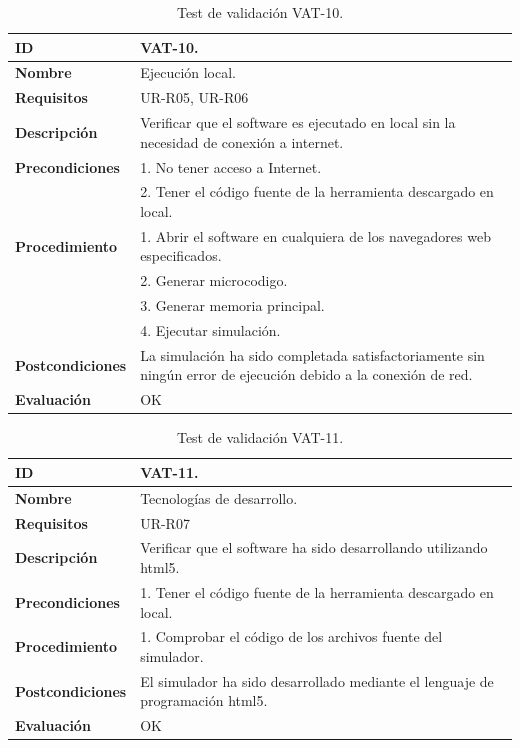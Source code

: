 \begin{center}
\begin{table}[htb]
\centering
\caption{Test de validación VAT-10.}
\begin{tabular}{@{}p{2.5cm} p{9cm}@{}} 
\toprule
\textbf{ID} 					& VAT-10. \\
\midrule
\textbf{Nombre} 				& Ejecución local. \\
\midrule
\textbf{Requisitos} 		& UR-R05, UR-R06\\
\midrule
\textbf{Descripción} 		& Verificar que el \gls{software} es ejecutado en local sin la necesidad de conexión a internet. \\
\midrule
\textbf{Precondiciones}		& 1. No tener acceso a Internet.\\
											& 2. Tener el código fuente de la herramienta descargado en local.\\
\midrule
\textbf{Procedimiento}			& 1. Abrir el \gls{software} en cualquiera de los navegadores web especificados. \\
							& 2. Generar \gls{microcodigo}.\\
							& 3. Generar memoria principal.\\
							& 4. Ejecutar simulación.\\
\midrule
\textbf{Postcondiciones} 		&  La simulación ha sido completada satisfactoriamente sin ningún error de ejecución debido a la conexión de red.\\
\midrule
\textbf{Evaluación} 			& OK \\
\bottomrule
\end{tabular}
\label{tab:vat-10}
\end{table}
\end{center}

\begin{center}
\begin{table}[htb]
\centering
\caption{Test de validación VAT-11.}
\begin{tabular}{@{}p{2.5cm} p{9cm}@{}} 
\toprule
\textbf{ID} 					& VAT-11. \\
\midrule
\textbf{Nombre} 				& Tecnologías de desarrollo. \\
\midrule
\textbf{Requisitos} 		& UR-R07\\
\midrule
\textbf{Descripción} 		& Verificar que el \gls{software} ha sido desarrollando utilizando \acrshort{html}5. \\
\midrule
\textbf{Precondiciones}		& 1. Tener el código fuente de la herramienta descargado en local. \\
\midrule
\textbf{Procedimiento}		& 1. Comprobar el código de los archivos fuente del simulador.\\
\midrule
\textbf{Postcondiciones} 		&  El simulador ha sido desarrollado mediante el lenguaje de programación \acrshort{html}5.\\
\midrule
\textbf{Evaluación} 			& OK \\
\bottomrule
\end{tabular}
\label{tab:vat-11}
\end{table}
\end{center}

